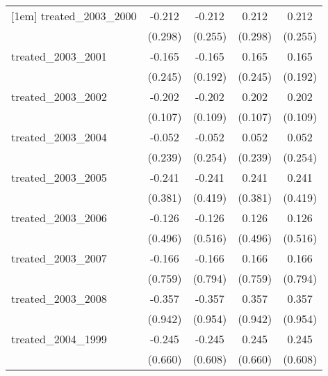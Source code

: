{\begin{tabular}{l*{4}{c}}
[1em]
treated\_2003\_2000&      -0.212         &      -0.212         &       0.212         &       0.212         \\
            &     (0.298)         &     (0.255)         &     (0.298)         &     (0.255)         \\
[1em]
treated\_2003\_2001&      -0.165         &      -0.165         &       0.165         &       0.165         \\
            &     (0.245)         &     (0.192)         &     (0.245)         &     (0.192)         \\
[1em]
treated\_2003\_2002&      -0.202         &      -0.202         &       0.202         &       0.202         \\
            &     (0.107)         &     (0.109)         &     (0.107)         &     (0.109)         \\
[1em]
treated\_2003\_2004&      -0.052         &      -0.052         &       0.052         &       0.052         \\
            &     (0.239)         &     (0.254)         &     (0.239)         &     (0.254)         \\
[1em]
treated\_2003\_2005&      -0.241         &      -0.241         &       0.241         &       0.241         \\
            &     (0.381)         &     (0.419)         &     (0.381)         &     (0.419)         \\
[1em]
treated\_2003\_2006&      -0.126         &      -0.126         &       0.126         &       0.126         \\
            &     (0.496)         &     (0.516)         &     (0.496)         &     (0.516)         \\
[1em]
treated\_2003\_2007&      -0.166         &      -0.166         &       0.166         &       0.166         \\
            &     (0.759)         &     (0.794)         &     (0.759)         &     (0.794)         \\
[1em]
treated\_2003\_2008&      -0.357         &      -0.357         &       0.357         &       0.357         \\
            &     (0.942)         &     (0.954)         &     (0.942)         &     (0.954)         \\
[1em]
treated\_2004\_1999&      -0.245         &      -0.245         &       0.245         &       0.245         \\
            &     (0.660)         &     (0.608)         &     (0.660)         &     (0.608)         \\

\end{tabular}}

